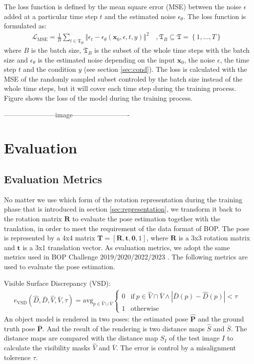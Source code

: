\documentclass[12pt,DIV14,BCOR12mm,a4paper,footinclude=false,headinclude,parskip=half-,twoside,openright,cleardoublepage=empty,toc=index,bibliography=totoc,listof=totoc]{scrreprt}
\numberwithin{equation}{chapter}
\begin{document}
The loss function is defined by the mean square error (MSE) between the noise $\epsilon$ added at a particular time step $t$ and the estimated noise $\epsilon_{\theta}$. The loss function is formulated as:
\begin{align}
  \mathcal{L}_{\text{MSE}}=\frac{1}{B}\sum_{t\in \mathfrak{T}_{B} }\left\Vert \epsilon_{t}-\epsilon_{\theta}(\mathbf{x}_{0},\epsilon, t, y)\right\Vert^{2} \quad , \mathfrak{T}_{B}\subseteq \mathfrak{T}=\left\{1,\dots,T\right\}
\end{align}
where $B$ is the batch size, $\mathfrak{T}_{B}$ is the subset of the whole time steps with the batch size and $\epsilon_{\theta}$ is the estimated noise depending on the input $\mathbf{x}_{0}$, the noise $\epsilon$, the time step $t$ and the condition $y$ (see section \ref{sec:cond}). The loss is calculated with the MSE of the randomly sampled subset controled by the batch size instead of the whole time steps, but it will cover each time step during the training process. Figure shows the loss of the model during the training process.

-----------------------image-------------------------

\section{Evaluation}
\subsection{Evaluation Metrics}
No matter we use which form of the rotation representation during the training phase that is introduced in section \ref{sec:representation}, we transform it back to the rotation matrix $\mathbf{R}$ to evaluate the pose estimation together with the tranlation, in order to meet the requirement of the data format of BOP. The pose is represented by a 4x4 matrix $\mathbf{T}=[\mathbf{R},\mathbf{t},\mathbf{0},1]$, where $\mathbf{R}$ is a 3x3 rotation matrix and $\mathbf{t}$ is a 3x1 translation vector. As evaluation metrics, we adopt the same metrics used in BOP Challenge 2019/2020/2022/2023 \cite{hodan2018bop,hodan2020bop}. The following metrics are used to evaluate the pose estimation. 

Visible Surface Discrepancy (VSD): 
\begin{align}
 e_{\text{VSD}}\left(\hat{D},\bar{D},\hat{V},\bar{V},\tau\right)=\text{avg}_{p\in \hat{V}\cup \bar{V}}
  \begin{cases}
    0 & \text{if} \ p\in \hat{V}\cap  \bar{V} \land \left|\bar{D}(p)-\hat{D}(p)\right|<\tau\\
    1 & \text{otherwise}
  \end{cases}
\end{align}
An object model is rendered in two poses: the estimated pose $\mathbf{\hat{P}}$ and the ground truth pose $\mathbf{\bar{P}}$. And the result of the rendering is two distance maps $\hat{S}$ and $\bar{S}$. The distance maps are compared with the distance map $S_I$ of the test image $I$ to calculate the visibility masks $\hat{V}$ and $\bar{V}$. The error is control by a misalignment tolerence $\tau$.
\end{document}
